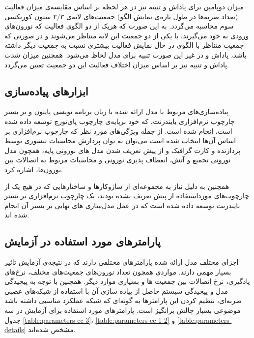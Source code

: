\documentclass[12pt]{report}
\begin{document}
	میزان دوپامین برای پاداش و تنبیه نیز در هر لحظه بر اساس مقایسه‌ی میزان فعالیت (تعداد ضربه‌ها در طول بازه‌ی نمایش الگو) جمعیت‌های لایه‌ی ۲/۳ ستون کورتکسی سوم محاسبه می‌گردد. به این صورت که هریک از دو الگوی فعالیت که نورون‌های ورودی به خود می‌گیرند، با یکی از دو جمعیت این لایه متناظر می‌شوند و در صورتی که جمعیت متناظر با الگوی در حال نمایش فعالیت بیشتری نسبت به جمعیت دیگر داشته باشد، پاداش و در غیر این صورت تنبیه برای مدل لحاظ می‌شود. همچنین میزان شدت پاداش و تنبیه نیز بر اساس میزان اختلاف فعالیت این دو جمعیت تعیین می‌گردد.
	
	

	\subsection{ابزار‌های پیاده‌سازی}
	
	پیاده‌سازی‌های مربوط با مدل ارائه شده با زبان برنامه نویسی پایتون و بر بستر چارچوب نرم‌افزاری بایندزنت، که خود برپایه‌ی چارچوب پای‌تورچ توسعه داده شده است، انجام شده است. از جمله ویژگی‌های مورد نظر که چارچوب نرم‌افزاری بر اساس آن‌ها انتخاب شده است می‌توان به توان پردازش مجاسبات تنسوری توسط پردازنده و کارت گرافیک و از پیش تعریف شدن مدل های نورونی پایه، همچون مدل نورونی تجمیع و آتش، انعطاف پذیری نورونی و محاسبات مربوط به اتصالات بین نورون‌ها، اشاره کرد.
	
	همچنین به دلیل نیاز به مجموعه‌ای از سازوکار‌ها و ساختارهایی که در هیچ یک از چارچوب‌های مورد‌استفاده از پیش تعریف نشده بودند، یک چارچوب نرم‌افزاری بر بستر بایندزنت توسعه داده شده است که در عمل مدل‌سازی های نهایی بر بستر آن انجام شده اند.
	
	\subsection{پارامتر‌های مورد استفاده در آزمایش}
	اجزای مختلف مدل ارائه شده پارامتر‌های مختلفی دارند که در نتیجه‌ی آزمایش تاثیر بسیار مهمی دارند. مواردی همچون تعداد نورون‌های جمعیت‌های مختلف، نرخ‌های یادگیری، نرخ اتصالات بین جمعیت ها و بسیاری موارد دیگر. همچنین با توجه به پیچیدگی مدل و پیچیدگی سیستم حاصل از پیاده سازی آن با استفاده از شبکه‌های عصبی ضربه‌ای، تنظیم کردن این پارامتر‌ها به گونه‌ای که شبکه عملکرد مناسبی داشته باشد موضوعی بسیار چالش برانگیز است. پارامتر‌های مورد استفاده برای آزمایش در سه جدول \ref{table:parameters-cc-3}، \ref{table:parameters-cc-1-2} و \ref{table:parameters-details} مشخص شده‌اند.
\end{document}
